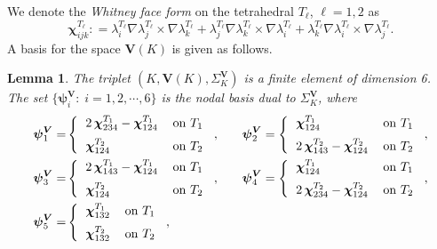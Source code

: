 \documentclass[twoside,reqno,final]{amsart}
\newtheorem{lemma}{Lemma}
\renewcommand{\b}[1]{{\boldsymbol{#1}}}
\newcommand{\grads}{{\nabla}}
\begin{document}
We denote the  {\it Whitney face form} on the tetrahedral $T_\ell$, $\ell=1,2$ as
\[
\b\chi_{ijk}^{T_\ell}: = \lambda_i^{T_\ell}\grads\lambda_j^{T_{\ell}}\times\grads\lambda_k^{T_{\ell}}
+\lambda_j^{T_\ell}\grads\lambda_k^{T_{\ell}}\times\grads\lambda_i^{T_{\ell}}
+\lambda_k^{T_\ell}\grads\lambda_i^{T_{\ell}}\times\grads\lambda_j^{T_{\ell}} .
\]
A basis for the space $\b V(K)$ is given as follows.
\begin{lemma}
\label{lemma-3}
The triplet  $(K,\b V(K), \Sigma^{\b V}_K)$ is a finite element of dimension 6.
The set $\{\b\psi^{\b V}_i:\;i=1,2,\cdots,6\}$ is the nodal basis dual to 
$\Sigma^{\b V}_K$, where 
 \begin{alignat*}{3}
 \b\psi^{\b V}_1 =&
\left\{ \begin{tabular}{l l}
            $2\,\b\chi_{234}^{T_1}-\b\chi_{124}^{T_1}$ & on $T_1$\vspace{0.2cm}\\
            $\b\chi_{124}^{T_2}$ & on $T_2$
            \end{tabular}\right.,
\quad && 
  \b\psi^{\b V}_2 =
  \left\{ \begin{tabular}{l l}
            $\b\chi_{124}^{T_1}$ & on $T_1$\vspace{0.2cm}\\
            $2\,\b\chi_{143}^{T_2}-\b\chi_{124}^{T_2}$ & on $T_2$
            \end{tabular}\right.,
\\
  \b\psi^{\b V}_3 =&\left\{ \begin{tabular}{l l}
            $2\,\b\chi_{143}^{T_1}-\b\chi_{124}^{T_1}$ & on $T_1$\vspace{0.2cm}\\
            $\b\chi_{124}^{T_2}$ & on $T_2$
            \end{tabular}\right.,
\quad &&  
\b\psi^{\b V}_4 =
  \left\{ \begin{tabular}{l l}
            $\b\chi_{124}^{T_1}$ & on $T_1$\vspace{0.2cm}\\
            $2\,\b\chi_{234}^{T_2}-\b\chi_{124}^{T_2}$ & on $T_2$
            \end{tabular}\right.,
\\
\b\psi^{\b V}_5 =&
\left\{ \begin{tabular}{l l}
            $\b\chi_{132}^{T_1}$ & on $T_1$\vspace{0.2cm}\\
            $\b\chi_{132}^{T_2}$ & on $T_2$
            \end{tabular}\right.,

\end{alignat*}
\end{lemma}
\end{document}
